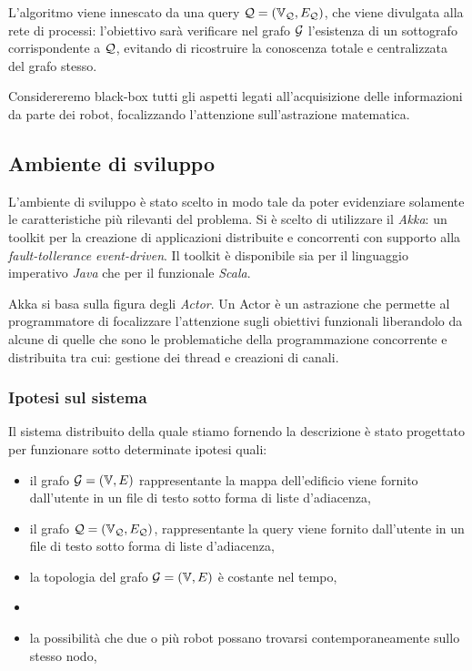 \documentclass{llncs}
\begin{document}
L'algoritmo viene innescato da una query $\mathcal{Q} = (\mathbb{V}_{\mathcal{Q}}, E_{\mathcal{Q}})$, 
che viene divulgata alla rete di processi: l'obiettivo sarà verificare
nel grafo $\mathcal{G}$ l'esistenza di un sottografo corrispondente a $\mathcal{Q}$,
evitando di ricostruire la conoscenza totale e centralizzata del
grafo stesso.

Considereremo black-box tutti gli aspetti legati all'acquisizione delle informazioni 
da parte dei robot, focalizzando l'attenzione sull'astrazione matematica.



\subsection{Ambiente di sviluppo}
L'ambiente di sviluppo è stato scelto in modo tale da poter evidenziare solamente
le caratteristiche più rilevanti del problema. 
Si è scelto di utilizzare il \emph{Akka}: un toolkit per la creazione di applicazioni 
distribuite e concorrenti con supporto alla \emph{fault-tollerance event-driven}.
Il toolkit è disponibile sia per il linguaggio imperativo \emph{Java} che per il 
funzionale \emph{Scala}.

Akka si basa sulla figura degli \emph{Actor}. Un Actor è un astrazione che permette
al programmatore di focalizzare l'attenzione sugli obiettivi funzionali liberandolo 
da alcune di quelle che sono le  problematiche della programmazione 
concorrente e distribuita tra cui: gestione dei thread e creazioni di canali.
\subsubsection{Ipotesi sul sistema}
Il sistema distribuito della quale stiamo fornendo la descrizione è stato progettato per funzionare 
sotto determinate ipotesi quali:
\begin{itemize}
	\item il grafo $\mathcal{G} = ( \mathbb{V}, E)$ rappresentante la mappa dell'edificio viene fornito dall'utente in un 
	file di testo sotto forma di liste d'adiacenza,
	\item il grafo  $\mathcal{Q} = (\mathbb{V}_{\mathcal{Q}}, E_{\mathcal{Q}})$,  rappresentante la query viene fornito dall'utente in un 
	file di testo sotto forma di liste d'adiacenza,
	\item la topologia del grafo $\mathcal{G} = ( \mathbb{V}, E)$ è costante nel tempo,
	\item 
	\item la possibilità che due o più robot possano trovarsi contemporaneamente sullo stesso nodo,
\end{itemize}
\end{document}
